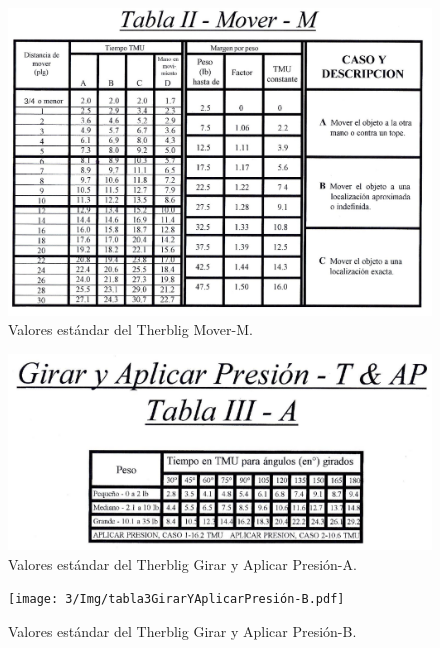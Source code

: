     \begin{figure}[H]
        \centering
        \includegraphics[scale=0.35]{3/Img/tabla2Mover-M.pdf}
        \caption{Valores estándar del Therblig Mover-M.}
        \label{fig:tabla2Mover-M}
    \end{figure}
    \begin{figure}[H]
        \centering
        \includegraphics[scale=0.4]{3/Img/tabla3GirarYAplicarPresion-A.pdf}
        \caption{Valores estándar del Therblig Girar y Aplicar Presión-A.}
        \label{fig:tabla3GirarYAplicarPresion-A}
    \end{figure}
    \begin{figure}[H]
        \centering
        \texttt{[image: 3/Img/tabla3GirarYAplicarPresión-B.pdf]}
        \caption{Valores estándar del Therblig Girar y Aplicar Presión-B.}
        \label{fig:tabla3GirarYAplicarPresión-B}
    \end{figure}
